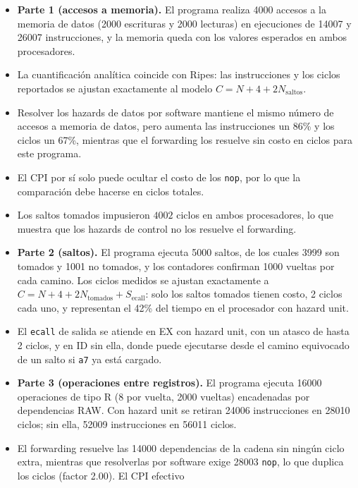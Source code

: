 \documentclass[11pt,a4paper]{article}
\begin{document}
\begin{itemize}
  \item \textbf{Parte 1 (accesos a memoria).} El programa realiza 4000 accesos
        a la memoria de datos (2000 escrituras y 2000 lecturas) en ejecuciones
        de 14007 y 26007 instrucciones, y la memoria queda con los valores
        esperados en ambos procesadores.
  \item La cuantificaci\'on anal\'itica coincide con Ripes: las instrucciones y los
        ciclos reportados se ajustan exactamente al modelo $C = N + 4 + 2N_{\text{saltos}}$.
  \item Resolver los hazards de datos por software mantiene el mismo n\'umero
        de accesos a memoria de datos, pero aumenta las instrucciones un 86\% y
        los ciclos un 67\%, mientras que el forwarding los resuelve sin
        costo en ciclos para este programa.
  \item El CPI por s\'i solo puede ocultar el costo de los \texttt{nop}, por lo
        que la comparaci\'on debe hacerse en ciclos totales.
  \item Los saltos tomados impusieron $4002$ ciclos en ambos procesadores,
        lo que muestra que los hazards de control no los resuelve el forwarding.
  \item \textbf{Parte 2 (saltos).} El programa ejecuta 5000 saltos, de los
        cuales 3999 son tomados y 1001 no tomados, y los contadores confirman
        1000 vueltas por cada camino. Los ciclos medidos se ajustan exactamente
        a $C = N + 4 + 2N_{\text{tomados}} + S_{\text{ecall}}$: solo los saltos
        tomados tienen costo, 2 ciclos cada uno, y representan el 42\% del
        tiempo en el procesador con hazard unit.
  \item El \texttt{ecall} de salida se atiende en EX con hazard unit, con un
        atasco de hasta 2 ciclos, y en ID sin ella, donde puede ejecutarse
        desde el camino equivocado de un salto si \texttt{a7} ya est\'a
        cargado.
  \item \textbf{Parte 3 (operaciones entre registros).} El programa ejecuta
        16000 operaciones de tipo R (8 por vuelta, 2000 vueltas) encadenadas
        por dependencias RAW. Con hazard unit se retiran 24006 instrucciones en
        28010 ciclos; sin ella, 52009 instrucciones en 56011 ciclos.
  \item El forwarding resuelve las 14000 dependencias de la cadena sin ning\'un
        ciclo extra, mientras que resolverlas por software exige 28003
        \texttt{nop}, lo que duplica los ciclos (factor 2.00). El CPI efectivo

\end{itemize}
\end{document}
